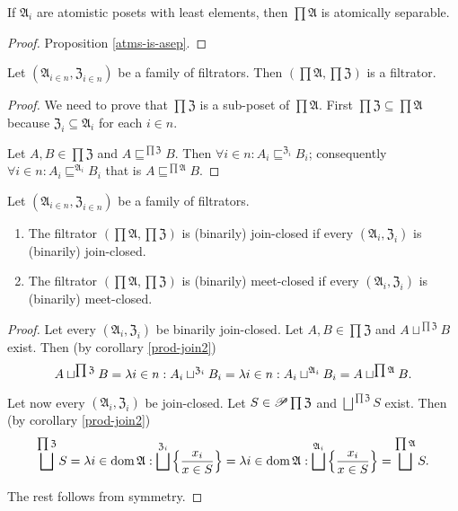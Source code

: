 \begin{cor}
If $\mathfrak{A}_{i}$ are atomistic posets with least elements, then
$\prod\mathfrak{A}$ is atomically separable.\end{cor}
\begin{proof}
Proposition \ref{atms-is-asep}.\end{proof}
\begin{prop}
Let $(\mathfrak{A}_{i\in n},\mathfrak{Z}_{i\in n})$ be a family of
filtrators. Then $\left(\prod\mathfrak{A},\prod\mathfrak{Z}\right)$
is a filtrator.\end{prop}
\begin{proof}
We need to prove that $\prod\mathfrak{Z}$ is a sub-poset of $\prod\mathfrak{A}$.
First $\prod\mathfrak{Z}\subseteq\prod\mathfrak{A}$ because $\mathfrak{Z}_{i}\subseteq\mathfrak{A}_{i}$
for each $i\in n$.

Let $A,B\in\prod\mathfrak{Z}$ and $A\sqsubseteq^{\prod\mathfrak{Z}}B$.
Then $\forall i\in n:A_{i}\sqsubseteq^{\mathfrak{Z}_{i}}B_{i}$; consequently
$\forall i\in n:A_{i}\sqsubseteq^{\mathfrak{A}_{i}}B_{i}$ that is
$A\sqsubseteq^{\prod\mathfrak{A}}B$.\end{proof}
\begin{prop}
Let $(\mathfrak{A}_{i\in n},\mathfrak{Z}_{i\in n})$ be a family of
filtrators.
\begin{enumerate}
\item The filtrator $\left(\prod\mathfrak{A},\prod\mathfrak{Z}\right)$
is (binarily) join-closed if every $(\mathfrak{A}_{i},\mathfrak{Z}_{i})$
is (binarily) join-closed.
\item The filtrator $\left(\prod\mathfrak{A},\prod\mathfrak{Z}\right)$
is (binarily) meet-closed if every $(\mathfrak{A}_{i},\mathfrak{Z}_{i})$
is (binarily) meet-closed.
\end{enumerate}
\end{prop}
\begin{proof}
Let every $(\mathfrak{A}_{i},\mathfrak{Z}_{i})$ be binarily join-closed.
Let $A,B\in\prod\mathfrak{Z}$ and $A\sqcup^{\prod\mathfrak{Z}}B$
exist. Then (by corollary \ref{prod-join2})
\[
A\sqcup^{\prod\mathfrak{Z}}B=\lambda i\in n:A_{i}\sqcup^{\mathfrak{Z}_{i}}B_{i}=\lambda i\in n:A_{i}\sqcup^{\mathfrak{A}_{i}}B_{i}=A\sqcup^{\prod\mathfrak{A}}B.
\]


Let now every $(\mathfrak{A}_{i},\mathfrak{Z}_{i})$ be join-closed.
Let $S\in\mathscr{P}\prod\mathfrak{Z}$ and $\bigsqcup^{\prod\mathfrak{Z}}S$
exist. Then (by corollary \ref{prod-join2})
\[
\bigsqcup^{\prod\mathfrak{Z}}S=\mylambda i{\dom\mathfrak{A}}{\bigsqcup^{\mathfrak{Z}_{i}}\setcond{x_{i}}{x\in S}}=\mylambda i{\dom\mathfrak{A}}{\bigsqcup^{\mathfrak{A}_{i}}\setcond{x_{i}}{x\in S}}=\bigsqcup^{\prod\mathfrak{A}}S.
\]


The rest follows from symmetry.\end{proof}
